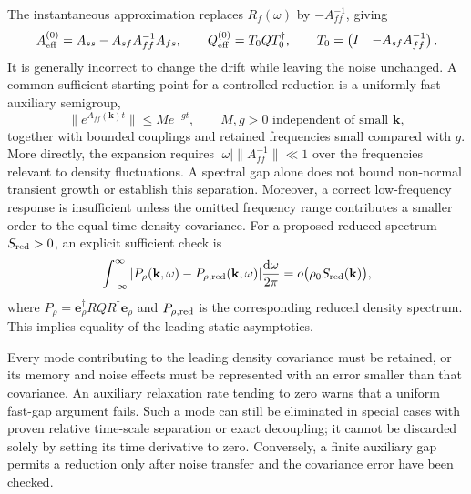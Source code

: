 \documentclass{article}
\begin{document}
The instantaneous approximation replaces $R_f(\omega)$ by $-A_{ff}^{-1}$, giving
\begin{equation}
    A_{\rm eff}^{(0)}=A_{ss}-A_{sf}A_{ff}^{-1}A_{fs},\qquad
    Q_{\rm eff}^{(0)}=T_0QT_0^\dagger,\qquad
    T_0=\begin{pmatrix}I&-A_{sf}A_{ff}^{-1}\end{pmatrix}.
    \label{eq:gfSchur}
\end{equation}
It is generally incorrect to change the drift while leaving the noise unchanged. A common sufficient starting point for a controlled reduction is a uniformly fast auxiliary semigroup,
\begin{equation}
    \|e^{A_{ff}(\mathbf k)t}\|\le M e^{-g t},\qquad M,g>0
    \text{ independent of small }\mathbf k,
    \label{eq:gfUniformGap}
\end{equation}
together with bounded couplings and retained frequencies small compared with $g$. More directly, the expansion requires $|\omega|\|A_{ff}^{-1}\|\ll1$ over the frequencies relevant to density fluctuations. A spectral gap alone does not bound non-normal transient growth or establish this separation. Moreover, a correct low-frequency response is insufficient unless the omitted frequency range contributes a smaller order to the equal-time density covariance. For a proposed reduced spectrum $S_{\rm red}>0$, an explicit sufficient check is
\begin{equation}
    \int_{-\infty}^{\infty}|P_\rho(\mathbf k,\omega)
    -P_{\rho,\rm red}(\mathbf k,\omega)|\frac{\mathrm d\omega}{2\pi}
    =o\bigl(\rho_0 S_{\rm red}(\mathbf k)\bigr),
    \label{eq:gfReductionError}
\end{equation}
where $P_\rho=\mathbf e_\rho^\dagger RQR^\dagger\mathbf e_\rho$ and $P_{\rho,\rm red}$ is the corresponding reduced density spectrum. This implies equality of the leading static asymptotics.

\begin{keybox}
Every mode contributing to the leading density covariance must be retained, or its memory and noise effects must be represented with an error smaller than that covariance. An auxiliary relaxation rate tending to zero warns that a uniform fast-gap argument fails. Such a mode can still be eliminated in special cases with proven relative time-scale separation or exact decoupling; it cannot be discarded solely by setting its time derivative to zero. Conversely, a finite auxiliary gap permits a reduction only after noise transfer and the covariance error have been checked.
\end{keybox}
\end{document}
